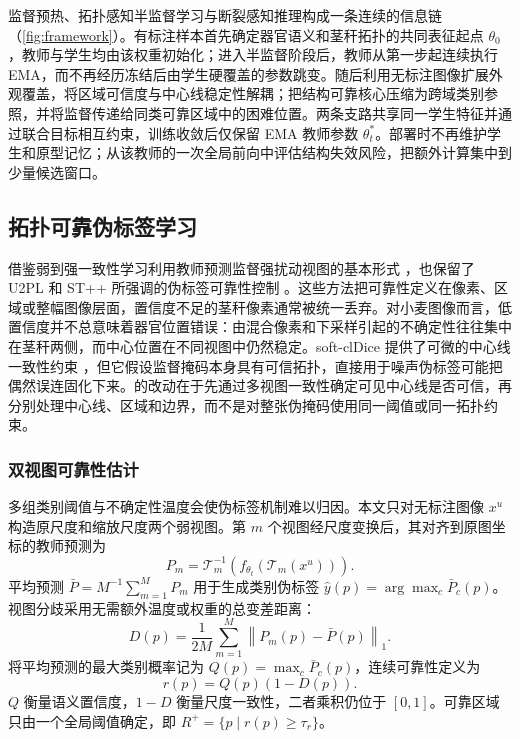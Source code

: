 监督预热、拓扑感知半监督学习与断裂感知推理构成一条连续的信息链（\cref{fig:framework}）。有标注样本首先确定器官语义和茎秆拓扑的共同表征起点 $\theta_0$，教师与学生均由该权重初始化；进入半监督阶段后，教师从第一步起连续执行 EMA，而不再经历冻结后由学生硬覆盖的参数跳变。\TRPL 随后利用无标注图像扩展外观覆盖，将区域可信度与中心线稳定性解耦；\TCPM 把结构可靠核心压缩为跨域类别参照，并将监督传递给同类可靠区域中的困难位置。两条支路共享同一学生特征并通过联合目标相互约束，训练收敛后仅保留 EMA 教师参数 $\theta_t^*$。部署时不再维护学生和原型记忆；\BAZR 从该教师的一次全局前向中评估结构失效风险，把额外计算集中到少量候选窗口。

\subsection{拓扑可靠伪标签学习}
\label{sec:trpl}

\TRPL 借鉴弱到强一致性学习利用教师预测监督强扰动视图的基本形式 \citep{yang2023unimatch}，也保留了 U2PL 和 ST++ 所强调的伪标签可靠性控制 \citep{wang2022u2pl,yang2022stpp}。这些方法把可靠性定义在像素、区域或整幅图像层面，置信度不足的茎秆像素通常被统一丢弃。对小麦图像而言，低置信度并不总意味着器官位置错误：由混合像素和下采样引起的不确定性往往集中在茎秆两侧，而中心位置在不同视图中仍然稳定。soft-clDice 提供了可微的中心线一致性约束 \citep{shit2021cldice}，但它假设监督掩码本身具有可信拓扑，直接用于噪声伪标签可能把偶然误连固化下来。\TRPL 的改动在于先通过多视图一致性确定可见中心线是否可信，再分别处理中心线、区域和边界，而不是对整张伪掩码使用同一阈值或同一拓扑约束。

\subsubsection{双视图可靠性估计}

多组类别阈值与不确定性温度会使伪标签机制难以归因。本文只对无标注图像 $x^u$ 构造原尺度和缩放尺度两个弱视图。第 $m$ 个视图经尺度变换后，其对齐到原图坐标的教师预测为
\begin{equation}
P_m=\mathcal T_m^{-1}
\left(f_{\theta_t}(\mathcal T_m(x^u))\right).
\end{equation}
平均预测 $\bar P=M^{-1}\sum_{m=1}^{M}P_m$ 用于生成类别伪标签 $\hat y(p)=\arg\max_c\bar P_c(p)$。视图分歧采用无需额外温度或权重的总变差距离：
\begin{equation}
D(p)=\frac{1}{2M}\sum_{m=1}^{M}
\left\|P_m(p)-\bar P(p)\right\|_1.
\label{eq:uncertainty}
\end{equation}
将平均预测的最大类别概率记为 $Q(p)=\max_c\bar P_c(p)$，连续可靠性定义为
\begin{equation}
r(p)=Q(p)\left(1-D(p)\right).
\label{eq:confidence}
\end{equation}
$Q$ 衡量语义置信度，$1-D$ 衡量尺度一致性，二者乘积仍位于 $[0,1]$。可靠区域只由一个全局阈值确定，即 $R^+=\{p\mid r(p)\geq\tau_r\}$。

